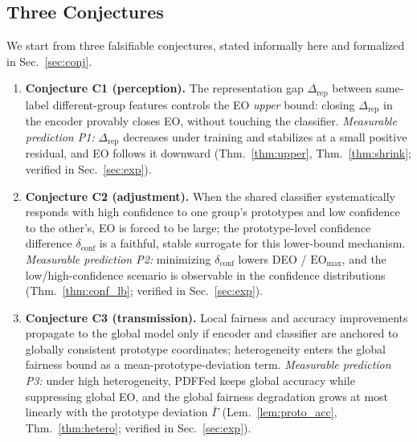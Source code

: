 \documentclass{article}
\newcommand{\rep}{\Delta_{\mathrm{rep}}}
\begin{document}
\subsection{Three Conjectures}
We start from three falsifiable conjectures, stated informally here and
formalized in Sec.~\ref{sec:conj}.
\begin{enumerate}
  \item \textbf{Conjecture C1 (perception).} The representation gap
        $\rep$ between same-label different-group features controls the EO
        \emph{upper} bound: closing $\rep$ in the encoder provably closes
        EO, without touching the classifier.
        \emph{Measurable prediction P1:} $\rep$ decreases under training and
        stabilizes at a small positive residual, and EO follows it downward
        (Thm.~\ref{thm:upper}, Thm.~\ref{thm:shrink}; verified in
        Sec.~\ref{sec:exp}).
  \item \textbf{Conjecture C2 (adjustment).} When the shared classifier
        systematically responds with high confidence to one group's
        prototypes and low confidence to the other's, EO is forced to be
        large; the prototype-level confidence difference
        $\delta_{\mathrm{conf}}$ is a faithful, stable surrogate for this
        lower-bound mechanism.
        \emph{Measurable prediction P2:} minimizing $\delta_{\mathrm{conf}}$
        lowers DEO / $\mathrm{EO}_{\max}$, and the low/high-confidence
        scenario is observable in the confidence distributions
        (Thm.~\ref{thm:conf_lb}; verified in Sec.~\ref{sec:exp}).
  \item \textbf{Conjecture C3 (transmission).} Local fairness and accuracy
        improvements propagate to the global model only if encoder and
        classifier are anchored to globally consistent prototype
        coordinates; heterogeneity enters the global fairness bound as a
        mean-prototype-deviation term.
        \emph{Measurable prediction P3:} under high heterogeneity, PDFFed
        keeps global accuracy while suppressing global EO, and the global
        fairness degradation grows at most linearly with the prototype
        deviation $\bar\Gamma$ (Lem.~\ref{lem:proto_acc},
        Thm.~\ref{thm:hetero}; verified in Sec.~\ref{sec:exp}).
\end{enumerate}
\end{document}

